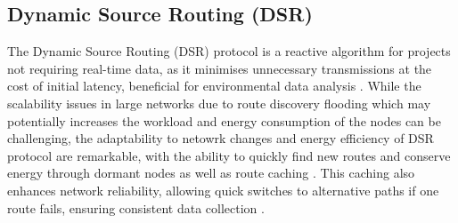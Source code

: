 \subsection{Dynamic Source Routing (DSR)}\label{sec:lr_dsr}
The Dynamic Source Routing (DSR) protocol is a reactive algorithm for projects not requiring real-time data, as it minimises unnecessary transmissions at the cost of initial latency, beneficial for environmental data analysis \cite{5431521}. While the scalability issues in large networks due to route discovery flooding which may potentially increases the workload and energy consumption of the nodes\cite{5431521} can be challenging, the adaptability to netowrk changes and energy efficiency of DSR protocol are remarkable, with the ability to quickly find new routes and conserve energy through dormant nodes as well as route caching \cite{6488843,1431308}. This caching also enhances network reliability, allowing quick switches to alternative paths if one route fails, ensuring consistent data collection \cite{1431308}.





